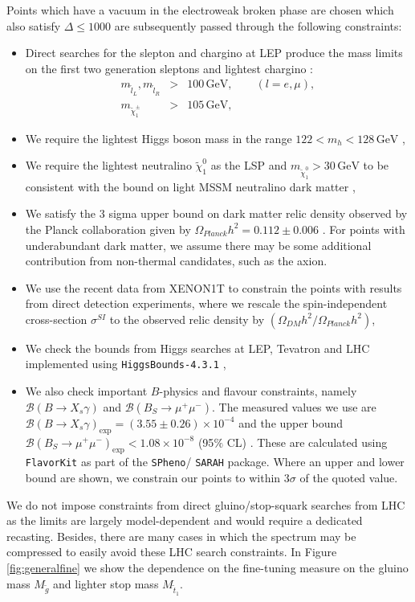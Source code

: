 Points which have a vacuum in the electroweak broken phase are chosen which also satisfy $\Delta \leq 1000$ are subsequently passed through the following constraints:
\begin{itemize}
	\item Direct searches for the slepton and chargino at LEP produce the mass limits on the first two generation sleptons and lightest chargino \cite{RN493}:
	\begin{eqnarray}
	m_{\widetilde{l}_L},m_{\widetilde{l}_R} &>& 100\,\text{GeV}, \qquad (l=e,\mu), \\
	m_{\widetilde{\chi}^{\pm}_1} &>& 105\,\text{GeV},
	\end{eqnarray}
    \item We require the lightest Higgs boson mass in the range $122 < m_h < 128\,\text{GeV}$ \cite{RN62,RN63},
    \item We require the lightest neutralino $\widetilde{\chi}^0_1$ as the LSP and $m_{\widetilde{\chi}_1^0}>30\,\text{GeV}$ to be consistent with the bound on light MSSM neutralino dark matter \cite{RN232,RN775},
    \item We satisfy the 3 sigma upper bound on dark matter relic density observed by the Planck collaboration given by $\Omega_{Planck}h^2 = 0.112 \pm 0.006$ \cite{RN498}. For points with underabundant dark matter, we assume there may be some additional contribution from non-thermal candidates, such as the axion.
    \item We use the recent data from XENON1T \cite{RN606} to constrain the points with results from direct detection experiments, where we rescale the spin-independent cross-section $\sigma^{SI}$ to the observed relic density by $(\Omega_{DM} h^2/\Omega_{Planck}h^2)$,
    \item We check the bounds from Higgs searches at LEP, Tevatron and LHC implemented using \texttt{HiggsBounds-4.3.1} \cite{RN170},
    \item We also check important $B$-physics and flavour constraints, namely $\mathcal{B}(B\rightarrow X_s\gamma)$ and $\mathcal{B}(B_{S} \rightarrow \mu^{+}\mu^{-})$. The measured values we use are $\mathcal{B}(B\rightarrow X_s\gamma)_{\text{exp}}=(3.55 \pm 0.26)\times10^{-4}$ \cite{RN773} and the upper bound $\mathcal{B}(B_{S} \rightarrow \mu^{+}\mu^{-})_{\text{exp}}<1.08\times10^{-8}$ (95$\%$ CL) \cite{RN772}. These are calculated using \texttt{FlavorKit} \cite{RN771} as part of the \texttt{SPheno}/ \texttt{SARAH} package. Where an upper and lower bound are shown, we constrain our points to within $3\sigma$ of the quoted value.
\end{itemize}
We do not impose constraints from direct gluino/stop-squark searches from LHC as the limits are largely model-dependent and would require a dedicated recasting. Besides, there are many cases in which the spectrum may be compressed to easily avoid these LHC search constraints. In Figure \ref{fig:generalfine} we show the dependence on the fine-tuning measure on the gluino mass $M_{\tilde{g}}$ and lighter stop mass $M_{\tilde{t}_1}$.

